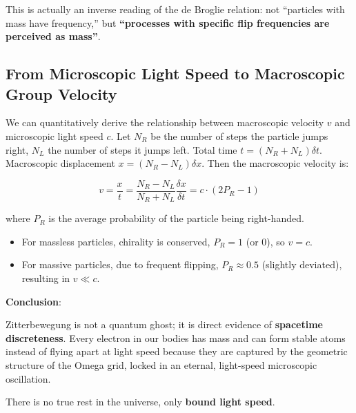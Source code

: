This is actually an inverse reading of the de Broglie relation: not ``particles with mass have frequency,'' but \textbf{``processes with specific flip frequencies are perceived as mass''}.

\subsection{From Microscopic Light Speed to Macroscopic Group Velocity}

We can quantitatively derive the relationship between macroscopic velocity $v$ and microscopic light speed $c$.
Let $N_R$ be the number of steps the particle jumps right, $N_L$ the number of steps it jumps left. Total time $t = (N_R + N_L) \delta t$.
Macroscopic displacement $x = (N_R - N_L) \delta x$.
Then the macroscopic velocity is:

\[v = \frac{x}{t} = \frac{N_R - N_L}{N_R + N_L} \frac{\delta x}{\delta t} = c \cdot (2P_R - 1)\]

where $P_R$ is the average probability of the particle being right-handed.

\begin{itemize}
\item For massless particles, chirality is conserved, $P_R = 1$ (or 0), so $v = c$.
\item For massive particles, due to frequent flipping, $P_R \approx 0.5$ (slightly deviated), resulting in $v \ll c$.
\end{itemize}

\textbf{Conclusion}:

Zitterbewegung is not a quantum ghost; it is direct evidence of \textbf{spacetime discreteness}. Every electron in our bodies has mass and can form stable atoms instead of flying apart at light speed because they are captured by the geometric structure of the Omega grid, locked in an eternal, light-speed microscopic oscillation.

There is no true rest in the universe, only \textbf{bound light speed}.

